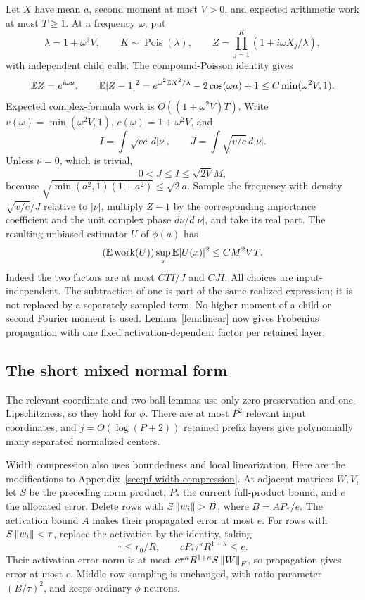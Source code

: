 Let $X$ have mean $a$, second moment at most $V>0$, and expected
arithmetic work at most $T\ge1$. At a frequency $\omega$, put
\[
 \lambda=1+\omega^2V,\qquad K\sim\operatorname{Pois}(\lambda),
 \qquad Z=\prod_{j=1}^K(1+i\omega X_j/\lambda),
\]
with independent child calls. The compound-Poisson identity gives
\[
 \mathbb E Z=e^{i\omega a},\qquad
 \mathbb E|Z-1|^2=e^{\omega^2\mathbb E X^2/\lambda}-2\cos(\omega a)+1
       \le C\min(\omega^2V,1).
\]
Expected complex-formula work is $O((1+\omega^2V)T)$.
Write $v(\omega)=\min(\omega^2V,1)$, $c(\omega)=1+\omega^2V$, and
\[
 I=\int\sqrt{vc}\,d|\nu|,\qquad
 J=\int\sqrt{v/c}\,d|\nu|.
\]
Unless $\nu=0$, which is trivial,
\[
 0<J\le I\le\sqrt{2V}M,
\]
because $\sqrt{\min(a^2,1)(1+a^2)}\le\sqrt2a$.
Sample the frequency with density $\sqrt{v/c}/J$ relative to
$|\nu|$, multiply $Z-1$ by the corresponding importance coefficient
and the unit complex phase $d\nu/d|\nu|$, and take its real part.
The resulting unbiased estimator $U$ of $\phi(a)$ has
\begin{equation}\label{eq:increment-potential}
 (\mathbb E\,\mathrm{work}(U))\sup_x\mathbb E|U(x)|^2
 \le C M^2VT.
\end{equation}
Indeed the two factors are at most $CTI/J$ and $CJI$.
All choices are input-independent. The subtraction of one is part of
the same realized expression; it is not replaced by a separately
sampled term. No higher moment of a child or second Fourier moment
is used. Lemma~\ref{lem:linear} now gives Frobenius propagation with
one fixed activation-dependent factor per retained layer.

\subsection{The short mixed normal form}

The relevant-coordinate and two-ball lemmas use only zero preservation
and one-Lipschitzness, so they hold for $\phi$. There are at most $P^2$
relevant input coordinates, and $j=O(\log(P+2))$ retained prefix
layers give polynomially many separated normalized centers.

Width compression also uses boundedness and local linearization.
Here are the modifications to Appendix~\ref{sec:pf-width-compression}.
At adjacent matrices $W,V$, let $S$ be the preceding norm product,
$P_*$ the current full-product bound, and $e$ the allocated error.
Delete rows with $S\left\lVert w_i\right\rVert>B$, where $B=AP_*/e$.
The activation bound $A$ makes their propagated error at most $e$.
For rows with $S\left\lVert w_i\right\rVert<\tau$, replace the activation by the
identity, taking
\[
 \tau\le r_0/R,\qquad cP_*\tau^\kappa R^{1+\kappa}\le e.
\]
Their activation-error norm is at most
$c\tau^\kappa R^{1+\kappa}S\left\lVert W\right\rVert_F$, so propagation gives
error at most $e$. Middle-row sampling is unchanged, with ratio
parameter $(B/\tau)^2$, and keeps ordinary $\phi$ neurons.

